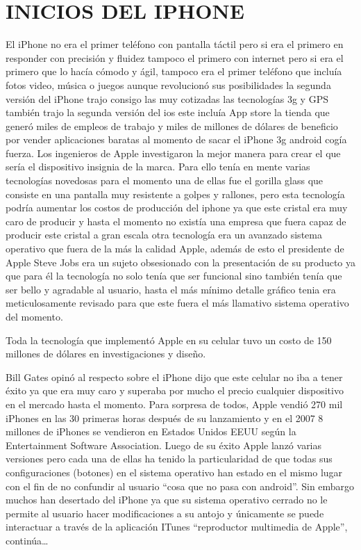 \section*{INICIOS DEL IPHONE}

El iPhone no era el primer teléfono con pantalla táctil pero si
era el primero en responder con precisión y fluidez tampoco el
primero con internet pero si era el primero que lo hacía cómodo
y ágil, tampoco era el primer teléfono que incluía fotos video,
música o juegos aunque revolucionó sus posibilidades la
segunda versión del iPhone trajo consigo las muy cotizadas las
tecnologías 3g y GPS también trajo la segunda versión del ios
este incluía App store la tienda que generó miles de empleos de
trabajo y miles de millones de dólares de beneficio por vender
aplicaciones baratas al momento de sacar el iPhone 3g android
cogía fuerza.
Los ingenieros de Apple investigaron la mejor manera para
crear el que sería el dispositivo insignia de la marca. Para ello
tenía en mente varias tecnologías novedosas para el momento
una de ellas fue el gorilla glass que consiste en una pantalla muy
resistente a golpes y rallones, pero esta tecnología podría
aumentar los costos de producción del iphone ya que este cristal
era muy caro de producir y hasta el momento no existía una
empresa que fuera capaz de producir este cristal a gran escala
otra tecnología era un avanzado sistema operativo que fuera de
la más la calidad Apple, además de esto el presidente de Apple
Steve Jobs era un sujeto obsesionado con la presentación de su
producto ya que para él la tecnología no solo tenía que ser
funcional sino también tenía que ser bello y agradable al
usuario, hasta el más mínimo detalle gráfico tenia era
meticulosamente revisado para que este fuera el más llamativo
sistema operativo del momento.

Toda la tecnología que implementó Apple en su celular tuvo un
costo de 150 millones de dólares en investigaciones y diseño.

Bill Gates opinó al respecto sobre el iPhone dijo que este celular
no iba a tener éxito ya que era muy caro y superaba por mucho
el precio cualquier dispositivo en el mercado hasta el momento.
Para sorpresa de todos, Apple vendió 270 mil iPhones en las 30
primeras horas después de su lanzamiento y en el 2007 8
millones de iPhones se vendieron en Estados Unidos EEUU
según la Entertainment Software Association. Luego de su éxito
Apple lanzó varias versiones pero cada una de ellas ha tenido la
particularidad de que todas sus configuraciones (botones) en el
sistema operativo han estado en el mismo lugar con el fin de no
confundir al usuario “cosa que no pasa con android”. Sin
embargo muchos han desertado del iPhone ya que su sistema
operativo cerrado no le permite al usuario hacer modificaciones
a su antojo y únicamente se puede interactuar a través de la
aplicación ITunes “reproductor multimedia de Apple”,
continúa…


